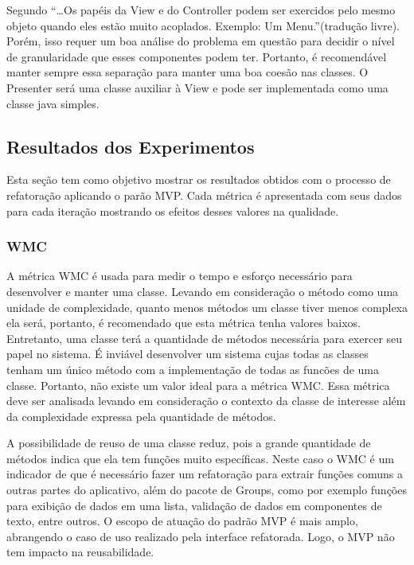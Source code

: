 \documentclass[conference]{IEEEtran}
\begin{document}
Segundo \cite{Reenskaug:1979} ``\ldots Os papéis da View e do
Controller podem ser exercidos pelo mesmo objeto quando eles estão muito
acoplados. Exemplo: Um Menu.''(tradução livre). Porém, isso requer um boa
análise do problema em questão para decidir o nível de granularidade que esses componentes podem ter.
Portanto, é recomendável manter sempre essa separação para manter uma boa coesão
nas classes. O Presenter será uma classe auxiliar à View e pode ser implementada
como uma classe java simples. 



\subsection{Resultados dos Experimentos}

Esta seção tem como objetivo mostrar os resultados obtidos com o processo de
refatoração aplicando o parão MVP. Cada métrica é apresentada com seus dados
para cada iteração mostrando os efeitos desses valores na qualidade.

\subsubsection{WMC}

A métrica WMC é usada para medir o tempo e esforço necessário para desenvolver e
manter uma classe. Levando em consideração o método como uma unidade de
complexidade, quanto menos métodos um classe tiver menos complexa ela será,
portanto, é recomendado que esta métrica tenha valores baixos.
Entretanto, uma classe terá a quantidade de métodos necessária para exercer seu
papel no sistema. É inviável desenvolver um sistema cujas todas as classes
tenham um único método com a implementação de todas as funcões de uma
classe. Portanto, não existe um valor ideal para a métrica WMC. Essa métrica
deve ser analisada levando em consideração o contexto da classe de interesse além da
complexidade expressa pela quantidade de métodos. 

A possibilidade de reuso de uma classe reduz, pois a grande quantidade de
métodos indica que ela tem funções muito específicas\cite{cksuite}. Neste caso o
WMC é um indicador de que é necessário fazer um refatoração para extrair funções comuns a outras partes do
aplicativo, além do pacote de Groups, como por exemplo funções para exibição de
dados em uma lista, validação de dados em componentes de texto, entre outros. O
escopo de atuação do padrão MVP é mais amplo, abrangendo o caso de uso realizado pela
interface refatorada. Logo, o MVP não tem impacto na reusabilidade.
\end{document}
